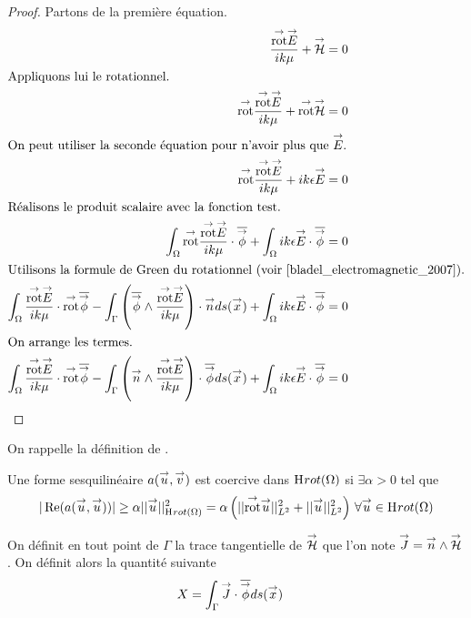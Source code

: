   \begin{proof}
    Partons de la première équation.
    \begin{align}
          \frac{\trot \vE}{ik\mu} + \vH &= 0
          \\ \intertext{Appliquons lui le rotationnel.}
          \trot \frac{\trot \vE}{ik\mu} + \trot \vH &= 0
          \\ \intertext{On peut utiliser la seconde équation pour n'avoir plus que \(\vE\).}
          \trot \frac{\trot \vE}{ik\mu} + ik\eps \vE &= 0
          \\ \intertext{Réalisons le produit scalaire avec la fonction test.}
          \int_\OO{ \trot \frac{\trot \vE}{ik\mu}\cdot \conj{\vect{\phi}}} +  \int_\OO ik\eps \vE \cdot \conj{\vect{\phi}} &= 0
          \\ \intertext{Utilisons la formule de Green du rotationnel (voir \cite[eq.~(A1.32)]{bladel_electromagnetic_2007}).}
          \int_\OO{ \frac{\trot \vE}{ik\mu}\cdot \trot \conj{\vect{\phi}}} - \int_\Gamma \left( \conj{\vect \phi} \pvect \frac{\trot \vE}{ik\mu}\right)  \cdot \vn ds(\vx) + \int_\OO ik\eps \vE \cdot \conj{\vect{\phi}} &= 0
          \\ \intertext{On arrange les termes.}
          \int_\OO \frac{\trot \vE}{ik\mu}\cdot \trot \conj{\vect{\phi}} - \int_\Gamma \left(\vn \pvect \frac{\trot \vE}{ik\mu}\right) \cdot \conj{\vect \phi} ds(\vx) +  \int_\OO ik\eps \vE \cdot \conj{\vect{\phi}} &= 0
      \end{align}
  \end{proof}

  On rappelle la définition de \cite[p.~59]{cessenat_mathematical_1996}.
  \begin{defn}
    Une forme sesquilinéaire \(a({\overset{\rightarrow}{u}},{\overset{\rightarrow}{v}})\) est coercive dans \(\mathrm{H}_\mathrm{{}}{rot}(\Omega)\) si \(\exists \alpha > 0\) tel que
    \[
      |\operatorname{Re}(a({\overset{\rightarrow}{u}},{\overset{\rightarrow}{u}}))| \ge \alpha ||{\overset{\rightarrow}{u}}||_{\mathrm{H}_\mathrm{{}}{rot}(\Omega)}^2 = \alpha \left( || {{\overset{\rightarrow}{\operatorname{rot}}}} {\overset{\rightarrow}{u}} ||_{L^2}^2 + || {\overset{\rightarrow}{u}} ||_{L^2}^2\right) \, \forall {\overset{\rightarrow}{u}} \in \mathrm{H}_\mathrm{{}}{rot}(\Omega)
    \]
   \end{defn}


  On définit en tout point de \(\Gamma\) la trace tangentielle de \({\overset{\rightarrow}{\mathcal{H}}}\) que l'on note \({\overset{\rightarrow}{J}} = {\overset{\rightarrow}{n}} \wedge {\overset{\rightarrow}{\mathcal{H}}}\). On définit alors la quantité suivante
  \begin{align}
    X &= \int_\Gamma {\overset{\rightarrow}{J}} \cdot {\overline{{\overset{\rightarrow}{\phi}}}} ds({\overset{\rightarrow}{x}})
  \end{align}

